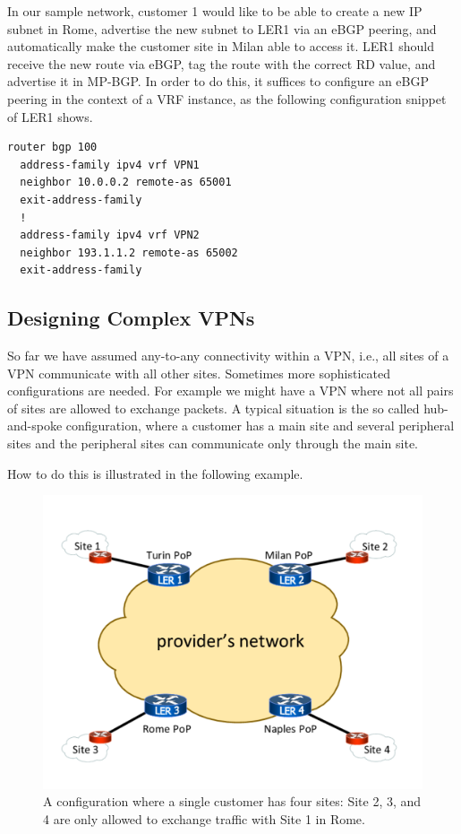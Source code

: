 \documentclass{article}
\newenvironment{codice}
{
\noindent
\begin{minipage}[b]{\columnwidth}
\definecolor{shadecolor}{rgb}{1,1,1}
\begin{framed}}
{
\vspace{-0.4cm}
\end{framed}
\end{minipage}
\definecolor{shadecolor}{rgb}{1,1,0.7}
}
\begin{document}
\begin{shaded}
In our sample network, customer 1 would like to be able to create a new IP 
subnet in Rome, advertise the new subnet to LER1 via an eBGP peering, and 
automatically make the customer site in Milan able to access it. LER1 should 
receive the new route via eBGP, tag the route with the correct RD value, and 
advertise it in MP-BGP. In order to do this, it suffices to configure an eBGP 
peering in the context of a VRF instance, as the following configuration snippet 
of LER1 shows.

\begin{codice}
\begin{verbatim}
router bgp 100
  address-family ipv4 vrf VPN1
  neighbor 10.0.0.2 remote-as 65001
  exit-address-family
  !
  address-family ipv4 vrf VPN2
  neighbor 193.1.1.2 remote-as 65002
  exit-address-family 
\end{verbatim}
\end{codice}


\end{shaded}



%
%
\subsection{Designing Complex VPNs}
So far we have assumed any-to-any connectivity within a VPN, i.e., all sites of 
a VPN communicate with all other sites. Sometimes more sophisticated 
configurations are needed. For example we might have a VPN where not all pairs 
of sites are allowed to exchange packets. A typical situation is the so called 
hub-and-spoke configuration, where a customer has a main site and several 
peripheral sites and the peripheral sites can communicate only through the main 
site.

How to do this is illustrated in the following example.

\begin{figure}
\centering
 \includegraphics[trim=0cm 1.5cm 0cm 1.5cm, clip=true, width=0.7\columnwidth]{figures/mpls-slides-27}
 \caption{A configuration where a single customer has four sites: Site 2, 3, and 4 are
only allowed to exchange traffic with  Site 1 in Rome.}
 \label{fig:mpls-slides-27}
\end{figure}
\end{document}
